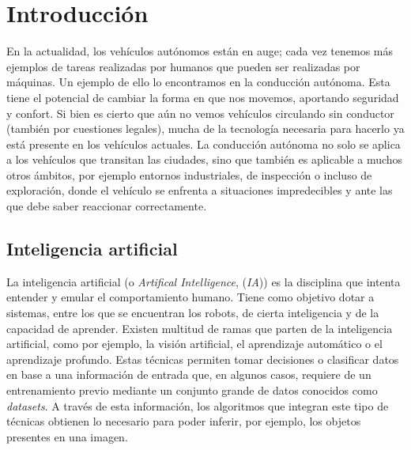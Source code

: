 \chapter{Introducción}
\label{cap:capitulo1}
\setcounter{page}{1}

En la actualidad, los vehículos autónomos están en auge; cada vez tenemos más ejemplos de tareas realizadas por humanos que pueden ser realizadas por máquinas. Un ejemplo de ello lo encontramos en la conducción autónoma. Esta tiene el potencial de cambiar la forma en que nos movemos, aportando seguridad y confort. Si bien es cierto que aún no vemos vehículos circulando sin conductor (también por cuestiones legales), mucha de la tecnología necesaria para hacerlo ya está presente en los vehículos actuales. La conducción autónoma no solo se aplica a los vehículos que transitan las ciudades, sino que también es aplicable a muchos otros ámbitos, por ejemplo entornos industriales, de inspección o incluso de exploración, donde el vehículo se enfrenta a situaciones impredecibles y ante las que debe saber reaccionar correctamente.\\

\section{Inteligencia artificial}
\label{sec:ia}
La inteligencia artificial (o \textit{Artifical Intelligence}, (\textit{IA})) es la disciplina que intenta entender y emular el comportamiento humano. Tiene como objetivo dotar a sistemas, entre los que se encuentran los robots, de cierta inteligencia y de la capacidad de aprender. Existen multitud de ramas que parten de la inteligencia artificial, como por ejemplo, la visión artificial, el aprendizaje automático o el aprendizaje profundo. Estas técnicas permiten tomar decisiones o clasificar datos en base a una información de entrada que, en algunos casos, requiere de un entrenamiento previo mediante un conjunto grande de datos conocidos como \textit{datasets}. A través de esta información, los algoritmos que integran este tipo de técnicas obtienen lo necesario para poder inferir, por ejemplo, los objetos presentes en una imagen.\\  

